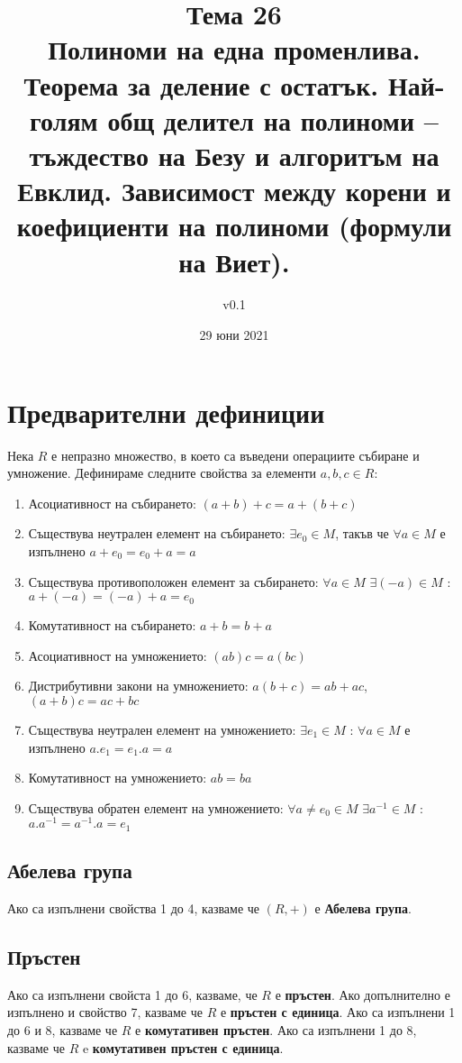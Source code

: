 \documentclass[fleqn,12pt]{article}
\title{Тема 26\\Полиноми на една променлива. Теорема за деление с остатък. Най-голям
общ делител на полиноми – тъждество на Безу и алгоритъм на Евклид.
Зависимост между корени и коефициенти на полиноми (формули на Виет).}
\author{v0.1}
\date{29 юни 2021}
\begin{document}
\maketitle

\tableofcontents

\section{Предварителни дефиниции}
Нека $R$ е непразно множество, в което са въведени операциите събиране и умножение.
Дефинираме следните свойства за елементи $a,b,c \in R$:
\begin{enumerate}
    \item \label{prop:add_assoc} Асоциативност на събирането: $(a + b) + c = a + (b + c)$
    \item \label{prop:add_neutral} Съществува неутрален елемент на събирането: $\exists e_0 \in M$, такъв че $\forall a \in M$ е изпълнено $a + e_0 = e_0 + a = a$
    \item \label{prop:add_inverse} Съществува противоположен елемент за събирането: $\forall a \in M$ $\exists (-a) \in M$ : $a + (-a) = (-a) + a = e_0$
    \item \label{prop:add_commute} Комутативност на събирането: $a + b = b + a$
    \item \label{prop:mul_assoc} Асоциативност на умножението: $(ab)c = a(bc)$
    \item \label{prop:mul_distr} Дистрибутивни закони на умножението: $a(b + c) = ab + ac$, $(a + b)c = ac + bc$
    \item \label{prop:mul_neutral} Съществува неутрален елемент на умножението: $\exists e_1 \in M$ : $\forall a \in M$ е изпълнено $a . e_1 = e_1 . a = a$
    \item \label{prop:mul_commute} Комутативност на умножението: $ab = ba$
    \item \label{prop:mul_inverse} Съществува обратен елемент на умножението: $\forall a \neq e_0 \in M$ $\exists a^{-1} \in M$ : $a . a^{-1} = a^{-1} . a = e_1$
\end{enumerate}

\subsection{Абелева група}
Ако са изпълнени свойства 1 до 4, казваме че $(R, +)$ е \textbf{Абелева група}.

\subsection{Пръстен}
Ако са изпълнени свойста 1 до 6, казваме, че $R$ е \textbf{пръстен}.
Ако допълнително е изпълнено и свойство 7, казваме че $R$ е \textbf{пръстен с единица}.
Ако са изпълнени 1 до 6 и 8, казваме че $R$ е \textbf{комутативен пръстен}.
Ако са изпълнени 1 до 8, казваме че $R$ e \textbf{комутативен пръстен с единица}.
\end{document}
